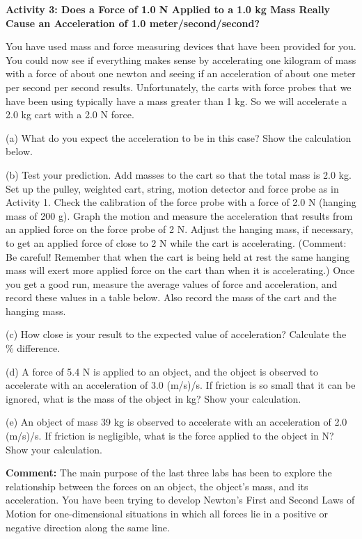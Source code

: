 \textbf{Activity 3: Does a Force of 1.0 N Applied to a 1.0 kg Mass Really Cause
an Acceleration of 1.0 meter/second/second?} 

You have used mass and force measuring devices that have been provided for you.
You could now see if everything makes sense by accelerating one kilogram of
mass with a force of about one newton and seeing if an acceleration of about
one meter per second per second results. Unfortunately, the carts with force
probes that we have been using typically have a mass greater than 1 kg. So we
will accelerate a 2.0 kg cart with a 2.0 N force.

(a) What do you expect the acceleration to be in this case? Show the calculation
below.
\vspace{20mm}

(b) Test your prediction. Add masses to the cart so that the total mass is 2.0
kg. Set up the pulley, weighted cart, string, motion detector and force probe
as in Activity 1. Check the calibration of the force probe with a force of 2.0
N (hanging mass of 200 g). Graph the motion and measure the acceleration that
results from an applied force on the force probe of 2 N. Adjust the hanging
mass, if necessary, to get an applied force of close to 2 N while the cart is
accelerating. (Comment: Be careful! Remember that when the cart is being held
at rest the same hanging mass will exert more applied force on the cart than
when it is accelerating.) Once you get a good run, measure the average values
of force and acceleration, and record these values in a table below. Also record
the mass of the cart and the hanging mass.
\vspace{30mm}

(c) How close is your result to the expected value of acceleration? Calculate
the \% difference.
\vspace{20mm}

(d) A force of 5.4 N is applied to an object, and the object is observed to
accelerate with an acceleration of 3.0 (m/s)/s. If friction is so small that it
can be ignored, what is the mass of the object in kg? Show your calculation.
\vspace{20mm}

(e) An object of mass 39 kg is observed to accelerate with an acceleration of
2.0 (m/s)/s. If friction is negligible, what is the force applied to the object
in N? Show your calculation.
\vspace{20mm}

\textbf{Comment:} The main purpose of the last three labs has been to explore
the relationship between the forces on an object, the object's mass, and its
acceleration. You have been trying to develop Newton's First and Second Laws
of Motion for one-dimensional situations in which all forces lie in a positive
or negative direction along the same line. 

